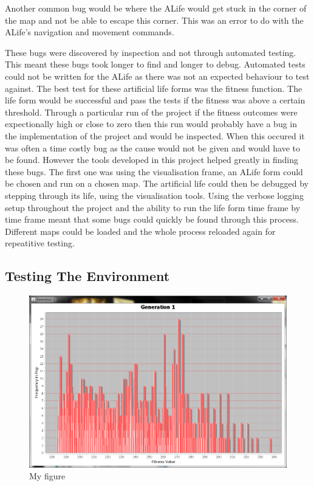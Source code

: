 \documentclass[12pt]{article}
\begin{document}
Another common bug would be where the ALife would get stuck in the corner of the map and not be able to escape this corner. This
was an error to do with the ALife's navigation and movement commands.

These bugs were discovered by inspection and not through automated testing. This meant these bugs took longer to find and longer to
debug. Automated tests could not be written for the ALife as there was not an expected behaviour to test against. The best
test for these artificial life forms was the fitness function. The life form would be successful and pass the tests if the fitness
was above a certain threshold. Through a particular run of the project if the fitness outcomes were expectionally high or close to 
zero then this run would probably have a bug in the implementation of the project and would be inspected. When this occured
it was often a time costly bug as the cause would not be given and would have to be found. However the tools developed in this
project helped greatly in finding these bugs. The first one was using the visualisation frame, an ALife form could be chosen
and run on a chosen map. The artificial life could then be debugged by stepping through its life, using the visualisation tools.
Using the verbose logging setup throughout the project and the ability to run the life form time frame by time frame meant that
some bugs could quickly be found through this process. Different maps could be loaded and the whole process reloaded again for
repeatitive testing. 


\subsection{Testing The Environment}


\begin{figure} [ht]
\centering
\includegraphics[scale = 0.25]{gen1-2500.png}
\caption{My figure}
\label{the-label-for-cross-referencing}
\end{figure}




\end{document}
